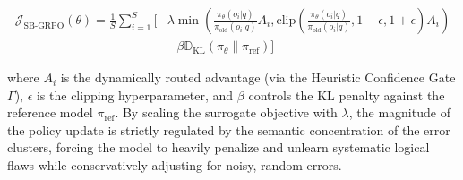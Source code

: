 \begin{equation}
\begin{aligned}
\mathcal{J}_{\text{SB-GRPO}}(\theta) = \frac{1}{S} \sum_{i=1}^{S} \Bigg[ &\lambda \min \left( \frac{\pi_\theta(o_i|q)}{\pi_{\text{old}}(o_i|q)} A_i, \text{clip}\left(\frac{\pi_\theta(o_i|q)}{\pi_{\text{old}}(o_i|q)}, 1-\epsilon, 1+\epsilon\right) A_i \right) \\
&- \beta \mathbb{D}_{\text{KL}}(\pi_\theta \| \pi_{\text{ref}}) \Bigg]
\end{aligned}
\end{equation}

where $A_i$ is the dynamically routed advantage (via the Heuristic Confidence Gate $\Gamma$), $\epsilon$ is the clipping hyperparameter, and $\beta$ controls the KL penalty against the reference model $\pi_{\text{ref}}$. By scaling the surrogate objective with $\lambda$, the magnitude of the policy update is strictly regulated by the semantic concentration of the error clusters, forcing the model to heavily penalize and unlearn systematic logical flaws while conservatively adjusting for noisy, random errors.

